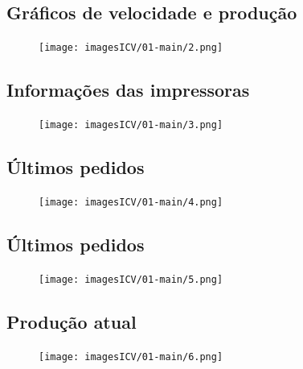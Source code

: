 \subsection{\small{Gráficos de velocidade e produção}}

\begin{figure}
    \centering
    \texttt{[image: imagesICV/01-main/2.png]}
\end{figure}

\newpage
\thispagestyle{fancy}
\vspace{\fill}

\subsection{\small{Informações das impressoras}}

\begin{figure}
    \centering
    \texttt{[image: imagesICV/01-main/3.png]}
\end{figure}

\newpage
\thispagestyle{fancy}
\vspace{\fill}

\subsection{\small{Últimos pedidos}}

\begin{figure}
    \centering
    \texttt{[image: imagesICV/01-main/4.png]}
\end{figure}

\newpage
\thispagestyle{fancy}
\vspace{\fill}

\subsection{\small{Últimos pedidos}}

\begin{figure}
    \centering
    \texttt{[image: imagesICV/01-main/5.png]}
\end{figure}

\newpage
\thispagestyle{fancy}
\vspace{\fill}

\subsection{\small{Produção atual}}

\begin{figure}
    \centering
    \texttt{[image: imagesICV/01-main/6.png]}
\end{figure}
